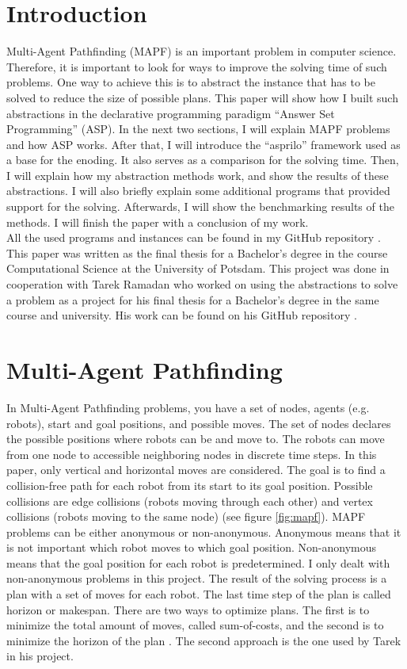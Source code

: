 \documentclass[runningheads]{llncs}
\begin{document}
\section{Introduction}
Multi-Agent Pathfinding (MAPF) is an important problem in computer science. Therefore, it is important to look for ways to improve the solving time of such problems. One way to achieve this is to abstract the instance that has to be solved to reduce the size of
possible plans. This paper will show how I built such abstractions in the declarative programming paradigm ``Answer Set Programming'' (ASP). In the next two sections, I will explain MAPF problems and how ASP works. After that, I will introduce the ``asprilo'' framework used as a base for the enoding. It also serves as a comparison for the solving time. Then, I will explain how my abstraction methods work, and show the results of these abstractions. I will also briefly explain some additional programs that provided support for the solving. Afterwards, I will show the benchmarking results of the methods. I will finish the paper with a conclusion of my work. \\
All the used programs and instances can be found in my GitHub repository \cite{my-git}. This paper was written as the final thesis for a Bachelor's degree in the course Computational Science at the University of Potsdam. This project was done in cooperation with Tarek Ramadan who worked on using the abstractions to solve a problem as a project for his final thesis for a Bachelor's degree in the same course and university. His work can be found on his GitHub repository \cite{tarek-git}.

\section{Multi-Agent Pathfinding}
In Multi-Agent Pathfinding problems, you have a set of nodes, agents (e.g. robots), start and goal positions, and possible moves. The set of nodes declares the possible positions where robots can be and move to. The robots can move from one node to accessible neighboring nodes in discrete time steps. In this paper, only vertical and horizontal moves are considered. The goal is to find a collision-free path for each robot from its start to its goal position. Possible collisions are edge collisions (robots moving through each other) and vertex collisions (robots moving to the same node) (see figure \ref{fig:mapf}). MAPF problems can be either anonymous or non-anonymous. Anonymous means that it is not important which robot moves to which goal position. Non-anonymous means that the goal position for each robot is predetermined.  I only dealt with non-anonymous problems in this project. The result of the solving process is a plan with a set of moves for each robot. The last time step of the plan is called horizon or makespan. There are two ways to optimize plans. The first is to minimize the total amount of moves, called sum-of-costs, and the second is to minimize the horizon of the plan \cite{mapf}. The second approach is the one used by Tarek in his project.
\end{document}
